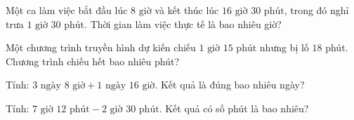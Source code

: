 \begin{ex}
  Một ca làm việc bắt đầu lúc $8\text{ giờ}$ và kết thúc lúc $16\text{ giờ } 30\text{ phút}$, trong đó nghỉ trưa $1\text{ giờ } 30\text{ phút}$. Thời gian làm việc thực tế là bao nhiêu giờ?
\end{ex}

\begin{ex}
  Một chương trình truyền hình dự kiến chiếu $1\text{ giờ } 15\text{ phút}$ nhưng bị lố $18$ phút. Chương trình chiếu hết bao nhiêu phút?
\end{ex}

\begin{ex}
  Tính: $3\text{ ngày } 8\text{ giờ} + 1\text{ ngày } 16\text{ giờ}$. Kết quả là đúng bao nhiêu ngày?
\end{ex}

\begin{ex}
  Tính: $7\text{ giờ } 12\text{ phút} - 2\text{ giờ } 30\text{ phút}$. Kết quả có số phút là bao nhiêu?
\end{ex}
